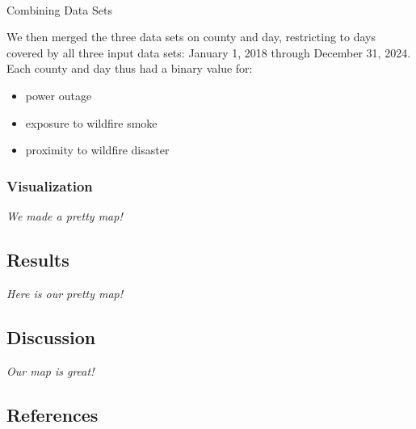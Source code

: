 \documentclass[
  letterpaper,
  DIV=11,
  numbers=noendperiod]{scrartcl}
\makeatletter
\let\oldparagraph\paragraph
\renewcommand{\paragraph}{
    \@ifstar
      \xxxParagraphStar
      \xxxParagraphNoStar
  }
\newcommand{\xxxParagraphStar}[1]{\oldparagraph*{#1}\mbox{}}
\newcommand{\xxxParagraphNoStar}[1]{\oldparagraph{#1}\mbox{}}
\providecommand{\tightlist}{%
  \setlength{\itemsep}{0pt}\setlength{\parskip}{0pt}}
\makeatother
\begin{document}
\paragraph{Combining Data Sets}\label{combining-data-sets}

We then merged the three data sets on county and day, restricting to
days covered by all three input data sets: January 1, 2018 through
December 31, 2024. Each county and day thus had a binary value for:

\begin{itemize}
\tightlist
\item
  power outage
\item
  exposure to wildfire smoke
\item
  proximity to wildfire disaster
\end{itemize}

\subsubsection{Visualization}\label{visualization}

\emph{We made a pretty map!}

\subsection{Results}\label{results}

\emph{Here is our pretty map!}

\subsection{Discussion}\label{discussion}

\emph{Our map is great!}

\subsection{References}\label{references}
\end{document}
